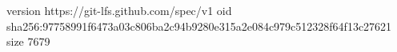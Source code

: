 version https://git-lfs.github.com/spec/v1
oid sha256:97758991f6473a03c806ba2c94b9280e315a2e084c979c512328f64f13c27621
size 7679
